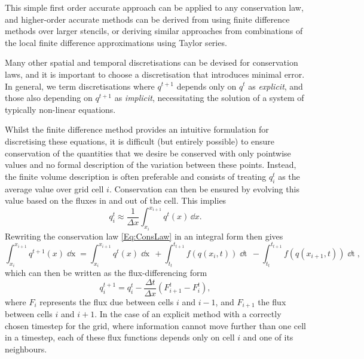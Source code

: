This simple first order accurate approach can be applied to any conservation law, and higher-order accurate methods can be derived from using finite difference methods over larger stencils, or deriving similar approaches from combinations of the local finite difference approximations using Taylor series.

Many other spatial and temporal discretisations can be devised for conservation laws, and it is important to choose a discretisation that introduces minimal error.
In general, we term discretisations where $q^{t+1}$ depends only on $q^{t}$ as \emph{explicit}, and those also depending on $q^{t+1}$ as \emph{implicit}, necessitating the solution of a system of typically non-linear equations.

Whilst the finite difference method provides an intuitive formulation for discretising these equations, it is difficult (but entirely possible) to ensure conservation of the quantities that we desire be conserved with only pointwise values and no formal description of the variation between these points.
Instead, the finite volume description is often preferable and consists of treating $q_i^t$ as the average value over grid cell $i$.
Conservation can then be ensured by evolving this value based on the fluxes in and out of the cell.
This implies
\begin{equation}
    q_i^t \approx \frac{1}{\Delta x}\int_{x_i}^{x_{i+1}} q^t(x)\, \dd{}x.
\end{equation}
Rewriting the conservation law \eqref{Eq:ConsLaw} in an integral form then gives
\begin{equation}
    \int_{x_i}^{x_{i+1}} q^{t+1}(x) \mathop{\dd{}x} = \int_{x_i}^{x_{i+1}} q^{t}(x) \mathop{\dd{}x}
                                         \,+ \int_{t_t}^{t_{t+1}} f(q(x_i, t)) \mathop{\dd{}t}
                                         \,- \int_{t_t}^{t_{t+1}} f(q(x_{i+1}, t)) \mathop{\dd{}t},
\end{equation}
which can then be written as the flux-differencing form
\begin{equation}\label{Eq:FiniteVolumeMethod}
    q_i^{t+1} = q_i^t - \frac{\Delta t}{\Delta x}\left( F^t_{i+1} - F^t_{i} \right),
\end{equation}
where $F_i$ represents the flux due between cells $i$ and $i-1$, and $F_{i+1}$ the flux between cells $i$ and $i+1$.
In the case of an explicit method with a correctly chosen timestep for the grid, where information cannot move further than one cell in a timestep, each of these flux functions depends only on cell $i$ and one of its neighbours.
